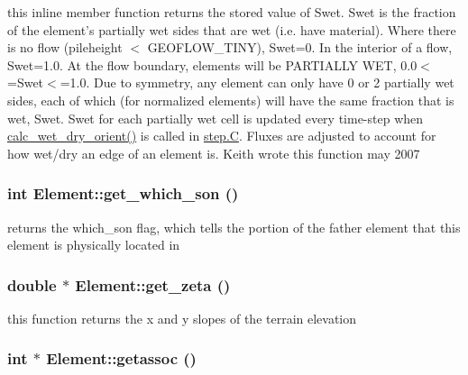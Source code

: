 this inline member function returns the stored value of Swet. Swet is the fraction of the element's partially wet sides that are wet (i.e. have material). Where there is no flow (pileheight $<$ GEOFLOW\_\-TINY), Swet=0. In the interior of a flow, Swet=1.0. At the flow boundary, elements will be PARTIALLY WET, 0.0$<$=Swet$<$=1.0. Due to symmetry, any element can only have 0 or 2 partially wet sides, each of which (for normalized elements) will have the same fraction that is wet, Swet. Swet for each partially wet cell is updated every time-step when \hyperlink{classElement_a129}{calc\_\-wet\_\-dry\_\-orient()} is called in \hyperlink{constant_8h_a21}{step.C}. Fluxes are adjusted to account for how wet/dry an edge of an element is. Keith wrote this function may 2007 

\hypertarget{classElement_a45}{
\subsubsection[get\_\-which\_\-son]{\setlength{\rightskip}{0pt plus 5cm}int Element::get\_\-which\_\-son ()}}
\label{classElement_a45}


returns the which\_\-son flag, which tells the portion of the father element that this element is physically located in 

\hypertarget{classElement_a67}{
\subsubsection[get\_\-zeta]{\setlength{\rightskip}{0pt plus 5cm}double $\ast$ Element::get\_\-zeta ()}}
\label{classElement_a67}


this function returns the x and y slopes of the terrain elevation 

\hypertarget{classElement_a11}{
\subsubsection[getassoc]{\setlength{\rightskip}{0pt plus 5cm}int $\ast$ Element::getassoc ()}}
\label{classElement_a11}


